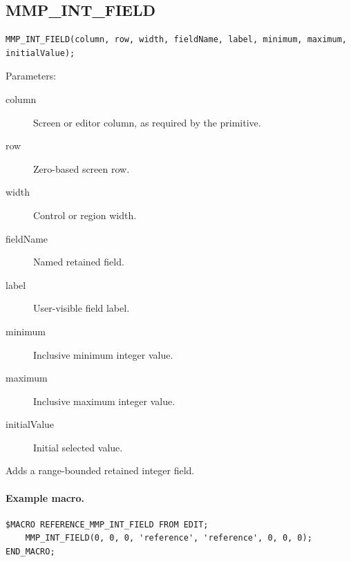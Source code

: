 \documentclass[a4paper,10pt,twoside,openany]{book}
\newenvironment{mrmacextension}{\begin{changebar}}{\end{changebar}}
\begin{document}
\begin{mrmacextension}
\label{prim:procedure-mmp-int-field}
\subsection*{MMP\_INT\_FIELD}
\begin{verbatim}
MMP_INT_FIELD(column, row, width, fieldName, label, minimum, maximum, initialValue);
\end{verbatim}
Parameters:
\begin{description}
\item[column] Screen or editor column, as required by the primitive.
\item[row] Zero-based screen row.
\item[width] Control or region width.
\item[fieldName] Named retained field.
\item[label] User-visible field label.
\item[minimum] Inclusive minimum integer value.
\item[maximum] Inclusive maximum integer value.
\item[initialValue] Initial selected value.
\end{description}

Adds a range-bounded retained integer field.

\paragraph{Example macro.}
\begin{verbatim}
$MACRO REFERENCE_MMP_INT_FIELD FROM EDIT;
    MMP_INT_FIELD(0, 0, 0, 'reference', 'reference', 0, 0, 0);
END_MACRO;
\end{verbatim}
\end{mrmacextension}
\end{document}
